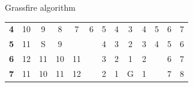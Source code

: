 \documentclass[compress,xcolor=table]{beamer}
\begin{document}
\begin{frame}{Grassfire algorithm}
\begin{center}
{\begin{tabular}{rcccccccccccc}
                \multicolumn{1}{r|}{\textbf{4}}  & \multicolumn{1}{c|}{10}        & \multicolumn{1}{c|}{9}                         & \multicolumn{1}{c|}{\cellcolor[HTML]{FFCC67}8} & \multicolumn{1}{c|}{\cellcolor[HTML]{FFCC67}7} & \multicolumn{1}{c|}{\cellcolor[HTML]{FFCC67}6} & \multicolumn{1}{c|}{\cellcolor[HTML]{FFCC67}5} & \multicolumn{1}{c|}{4}                         & \multicolumn{1}{c|}{3}                         & \multicolumn{1}{c|}{4}                        & \multicolumn{1}{c|}{5}                        & \multicolumn{1}{c|}{6}                        & \multicolumn{1}{c|}{7}         \\ \cline{2-13} 
                \multicolumn{1}{r|}{\textbf{5}}  & \multicolumn{1}{c|}{11}        & \multicolumn{1}{c|}{\cellcolor[HTML]{63AC4B}S} & \multicolumn{1}{c|}{\cellcolor[HTML]{FFCC67}9} & \multicolumn{1}{c|}{\cellcolor[HTML]{000000}}  & \multicolumn{1}{c|}{\cellcolor[HTML]{000000}}  & \multicolumn{1}{c|}{\cellcolor[HTML]{FFCC67}4} & \multicolumn{1}{c|}{\cellcolor[HTML]{FFCC67}3} & \multicolumn{1}{c|}{2}                         & \multicolumn{1}{c|}{3}                        & \multicolumn{1}{c|}{4}                        & \multicolumn{1}{c|}{5}                        & \multicolumn{1}{c|}{6}         \\ \cline{2-13} 
                \multicolumn{1}{r|}{\textbf{6}}  & \multicolumn{1}{c|}{12}        & \multicolumn{1}{c|}{11}                        & \multicolumn{1}{c|}{10}                        & \multicolumn{1}{c|}{11}                        & \multicolumn{1}{c|}{\cellcolor[HTML]{000000}}  & \multicolumn{1}{c|}{3}                         & \multicolumn{1}{c|}{\cellcolor[HTML]{FFCC67}2} & \multicolumn{1}{c|}{\cellcolor[HTML]{FFCC67}1} & \multicolumn{1}{c|}{2}                        & \multicolumn{1}{c|}{\cellcolor[HTML]{000000}} & \multicolumn{1}{c|}{6}                        & \multicolumn{1}{c|}{7}         \\ \cline{2-13} 
                \multicolumn{1}{r|}{\textbf{7}}  & \multicolumn{1}{c|}{11}        & \multicolumn{1}{c|}{10}                        & \multicolumn{1}{c|}{11}                        & \multicolumn{1}{c|}{12}                        & \multicolumn{1}{c|}{\cellcolor[HTML]{000000}}  & \multicolumn{1}{c|}{2}                         & \multicolumn{1}{c|}{1}                         & \multicolumn{1}{c|}{\cellcolor[HTML]{CA4444}G} & \multicolumn{1}{c|}{1}                        & \multicolumn{1}{c|}{\cellcolor[HTML]{000000}} & \multicolumn{1}{c|}{7}                        & \multicolumn{1}{c|}{8}         \\ \cline{2-13} 

\end{tabular}}
\end{center}
\end{frame}
\end{document}
